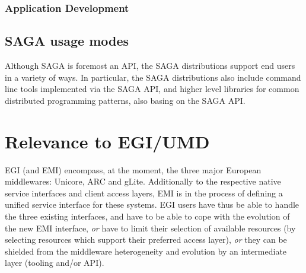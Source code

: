\documentclass[12pt]{article}
\newcommand{\I}[1]{\textit{#1}}
\begin{document}
\subsubsection*{Application Development}






\subsection{SAGA usage modes}

  Although SAGA is foremost an API, the SAGA distributions support end
  users in a variety of ways.  In particular, the SAGA distributions
  also include command line tools implemented via the SAGA API, and
  higher level libraries for common distributed programming patterns,
  also basing on the SAGA API.


\section{Relevance to EGI/UMD}

EGI (and EMI) encompass, at the moment, the three major European
middlewares: Unicore, ARC and gLite.  Additionally to the respective
native service interfaces and client access layers, EMI is in the
process of defining a unified service interface for these systems.
EGI users have thus be able to handle the three existing interfaces,
and have to be able to cope with the evolution of the new EMI
interface, \I{or} have to limit their selection of available resources
(by selecting resources which support their preferred access layer),
\I{or} they can be shielded from the middleware heterogeneity and
evolution by an intermediate layer (tooling and/or API).
 
\end{document}
